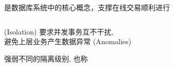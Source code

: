 
\begin{frame}{}
  \begin{center}
    是数据库系统中的核心概念，支撑在线交易顺利进行
  \end{center}

  \begin{columns}
  \end{columns}

  \vspace{0.30cm}
  \begin{center}
     (Isolation) 要求并发事务互不干扰, \\[3pt]
    避免上层业务产生数据异常 (Anomalies)
  \end{center}
\end{frame}

\begin{frame}{}
  \begin{center}
    强弱不同的隔离级别, 也称

    \vspace{0.30cm}
  \end{center}
\end{frame}





